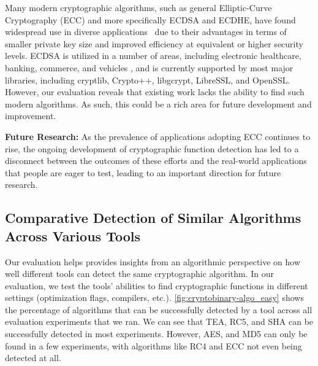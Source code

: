 Many modern cryptographic algorithms, such as general Elliptic-Curve Cryptography (ECC) and more specifically ECDSA and ECDHE, have found widespread use in diverse applications~\cite{harkanson2017applications} due to their advantages in terms of smaller private key size and improved efficiency at equivalent or higher security levels. ECDSA is utilized in a number of areas, including electronic healthcare, banking, commerce, and vehicles \cite{al2019efficient}, and is currently supported by most major libraries, including cryptlib, Crypto++, libgcrypt, LibreSSL, and OpenSSL.
However, our evaluation reveals that existing work lacks the ability to find such modern algorithms. As such, this could be a rich area for future development and improvement. 
\begin{takeaway}
\textbf{Future Research:} 
As the prevalence of applications adopting ECC continues to rise, the ongoing development of cryptographic function detection has led to a disconnect between the outcomes of these efforts and the real-world applications that people are eager to test, leading to an important direction for future research.
\end{takeaway}

\subsection{Comparative Detection of Similar Algorithms Across Various Tools}

Our evaluation helps provides insights from an algorithmic perspective on how well different tools can detect the same cryptographic algorithm. In our evaluation, we test the tools' abilities to find cryptographic functions in different settings (optimization flags, compilers, etc.). \autoref{fig:cryptobinary-algo_easy} shows the percentage of algorithms that can be successfully detected by a tool across all evaluation experiments that we ran.
We can see that TEA, RC5, and SHA can be successfully detected in most experiments. However, AES, and MD5 can only be found in a few experiments, with algorithms like RC4 and ECC not even being detected at all.

